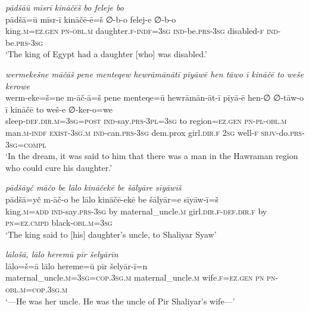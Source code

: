 \ea \label{ŽP.146}
\textit{pādšāū mīsrī kināčēš bo feleje bo} \\ 
\gll pādšā=ū mīsr-ī kināčē-ē=š ∅-b-o felej-e ∅-b-o \\ 
 king\textsc{.m}\textsc{\textsc{=ez.gen}} \textsc{pn}\textsc{-obl}\textsc{.m} daughter\textsc{.f}\textsc{-indf}\textsc{=3sg} \textsc{ind-}be\textsc{.prs}\textsc{-3sg} disabled\textsc{-f} \textsc{ind-}be\textsc{.prs}\textsc{-3sg} \\ 
\glt `The king of Egypt had a daughter [who] was disabled.'
\z 
 
\ea \label{ŽP.154}
\textit{wermekešne māčāš pene menteqew hewrāmānātī pīyāwē hen tāwo ī kināčē to weše kerowe} \\ 
\gll werm-eke=š=ne m-āč-ā=š pene menteqe=ū hewrāmān-āt-ī pīyā-ē hen-∅ ∅-tāw-o ī kināčē to weš-e ∅-ker-o=we \\ 
 sleep\textsc{-def}\textsc{.dir}\textsc{.m}\textsc{=3sg}\textsc{=\textsc{post}} \textsc{ind-}say\textsc{.prs}\textsc{-3pl}\textsc{=3sg} to region=\textsc{ez.gen} \textsc{pn}\textsc{\textsc{-pl}}\textsc{-obl}\textsc{.m} man\textsc{.m}\textsc{-indf} \textsc{exist}\textsc{-3sg}\textsc{.m} \textsc{ind-}can\textsc{.prs}\textsc{-3sg} dem.prox girl\textsc{.dir}\textsc{.f} \textsc{2sg} well\textsc{-f} \textsc{sbjv-}do\textsc{.prs}\textsc{-3sg}\textsc{=compl} \\ 
\glt `In the dream, it was said to him that there was a man in the Hawraman region who could cure his daughter.'
\z 
 
\ea \label{ŽP.157}
\textit{pādšāyč māčo be lālo kināčekē be šālyāre sīyāwīš} \\ 
\gll pādšā=yč m-āč-o be lālo kināčē-ekē be šālyār=e sīyāw-ī=š \\ 
 king\textsc{.m}\textsc{=add} \textsc{ind-}say\textsc{.prs}\textsc{-3sg} by maternal\_uncle\textsc{.m} girl\textsc{.dir}\textsc{.f}\textsc{-def}\textsc{.dir}\textsc{.f} by \textsc{pn}\textsc{=ez}\textsc{.cmpd} black\textsc{-obl}\textsc{.m}\textsc{=3sg} \\ 
\glt `The king said to [his] daughter’s uncle, to Shaliyar Syaw'
\z 
 
\ea \label{ŽP.158}
\textit{lālošā, lālo heremū pīr šelyārīn} \\ 
\gll lālo=š=ā lālo hereme=ū pīr šelyār-ī=n \\ 
 maternal\_uncle\textsc{.m}\textsc{=3sg}\textsc{=cop}\textsc{.3sg}\textsc{.m} maternal\_uncle\textsc{.m} wife\textsc{.f}\textsc{\textsc{=ez.gen}} \textsc{pn} \textsc{pn}\textsc{-obl}\textsc{.m}\textsc{=cop}\textsc{.3sg}\textsc{.m} \\ 
\glt `—He was her uncle. He was the uncle of Pir Shaliyar’s wife—'
\z 
 
